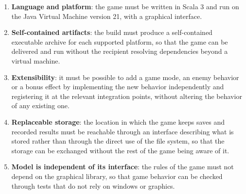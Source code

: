 \begin{enumerate}[label=\textbf{TC-\arabic*}]
  \item \textbf{Language and platform}: the game must be written in Scala 3 and run on the Java Virtual Machine
  version 21, with a graphical interface.
  \item \textbf{Self-contained artifacts}: the build must produce a self-contained executable archive for each
  supported platform, so that the game can be delivered and run without the recipient resolving dependencies beyond
  a virtual machine.
  \item \textbf{Extensibility}: it must be possible to add a game mode, an enemy behavior or a bonus effect by
  implementing the new behavior independently and registering it at the relevant integration points, without altering
  the behavior of any existing one.
  \item  \textbf{Replaceable storage}: the location in which the game keeps saves and recorded results must be
  reachable through an interface describing what is stored rather than through the direct use of the file
  system, so that the storage can be exchanged without the rest of the game being aware of it.
  \item \textbf{Model is independent of its interface}: the rules of the game must not depend on the graphical
  library, so that game behavior can be checked through tests that do not rely on windows or graphics.
\end{enumerate}
